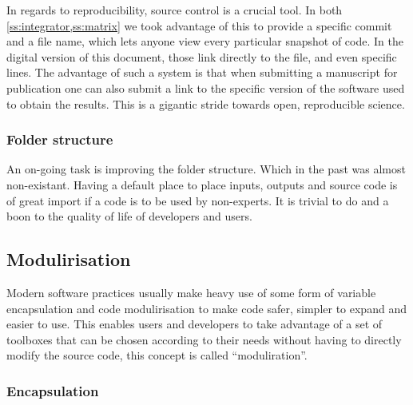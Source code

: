 In regards to reproducibility, source control is a crucial tool. In both \cref{ss:integrator,ss:matrix} we took advantage of this to provide a specific commit and a file name, which lets anyone view every particular snapshot of code. In the digital version of this document, those link directly to the file, and even specific lines. The advantage of such a system is that when submitting a manuscript for publication one can also submit a link to the specific version of the software used to obtain the results. This is a gigantic stride towards open, reproducible science.

\subsubsection{Folder structure}

An on-going task is improving the folder structure. Which in the past was almost non-existant. Having a default place to place inputs, outputs and source code is of great import if a code is to be used by non-experts. It is trivial to do and a boon to the quality of life of developers and users.

\subsection{Modulirisation}

Modern software practices usually make heavy use of some form of variable encapsulation and code modulirisation to make code safer, simpler to expand and easier to use. This enables users and developers to take advantage of a set of toolboxes that can be chosen according to their needs without having to directly modify the source code, this concept is called ``moduliration''.

\subsubsection{Encapsulation}

